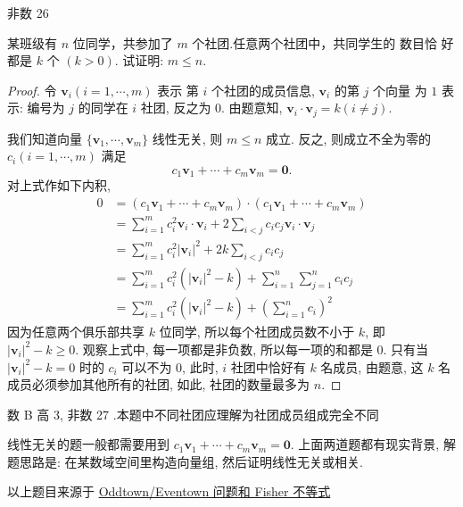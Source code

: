 \documentclass[a4paper, 12pt, UTF8]{ctexart}
\begin{document}
{\color{GoogleGreen} 非数 26}

\clearpage
\begin{exa}
    某班级有 $n$ 位同学，共参加了 $m$ 个社团.任意两个社团中，共同学生的
    数目恰 好都是 $k$ 个 $(k>0)$. 试证明: $m \leq n$.
\end{exa} {\color{GoogleRed} \begin{proof}
    令 $\bm{v}_{i}(i = 1, \cdots, m)$ 表示
      第 $i$ 个社团的成员信息, $\bm{v}_{i}$ 的第 $j$ 个向量
      为 $1$ 表示: 编号为 $j$ 的同学在 $i$ 社团, 反之为 $0$. 由题意知, $\bm{v}_{i}\cdot \bm{v}_{j} = k(i\neq j)$.

      我们知道向量 $\{\bm{v}_{1}, \cdots, \bm{v}_{m} \}$ 线性无关, 则 $m \leq n$ 成立. 反之, 则成立不全为零的 $c_{i}(i=1,\cdots,m)$ 满足
      \[
          c_{1}\bm{v}_{1} + \cdots + c_{m}\bm{v}_{m} = \bm{0}.
      \]
      对上式作如下内积,
      \[
          \begin{aligned}
            0 &= (c_{1}\bm{v}_{1} + \cdots + c_{m}\bm{v}_{m}) \cdot (c_{1}\bm{v}_{1} + \cdots + c_{m}\bm{v}_{m}) \\[3pt]
            &= \sum_{i=1}^{m}c_{i}^{2}\bm{v}_{i}\cdot\bm{v}_{i} + 2\sum_{i<j}c_{i}c_{j}\bm{v}_{i}\cdot\bm{v}_{j} \\[3pt]
            &= \sum_{i=1}^{m}c_{i}^{2}|\bm{v}_{i}|^{2} + 2k\sum_{i<j}c_{i}c_{j} \\[3pt]
            &= \sum_{i=1}^{m}c_{i}^{2}(|\bm{v}_{i}|^{2}-k) + \sum_{i=1}^{n}\sum_{j=1}^{n}c_{i}c_{j}\\[3pt]
            &= \sum_{i=1}^{m}c_{i}^{2}(|\bm{v}_{i}|^{2}-k) + \left( \sum_{i=1}^{n} c_{i}\right)^{2}
          \end{aligned}
      \]
      因为任意两个俱乐部共享 $k$ 位同学, 所以每个社团成员数不小于 $k$, 即 $|\bm{v}_{i}|^{2}-k \geq 0$. 观察上式中, 每一项都是非负数, 所以每一项的和都是 $0$. 只有当 $|\bm{v}_{i}|^{2}-k = 0$ 时的 $c_{i}$ 可以不为 $0$, 此时, $i$ 社团中恰好有 $k$ 名成员, 由题意, 这 $k$ 名成员必须参加其他所有的社团, 如此, 社团的数量最多为 $n$.
    
\end{proof}
}

{\color{GoogleGreen} 数 B 高 3, 非数 27 .本题中不同社团应理解为社团成员组成完全不同

}

\vspace{3em}

\begin{thm}{}{}
    {\adkaiti
      线性无关的题一般都需要用到 {\color{GoogleRed}$ c_{1}\bm{v}_{1} + \cdots + c_{m}\bm{v}_{m} = \bm{0}$}. 上面两道题都有现实背景, 解题思路是: 在某数域空间里构造向量组, 然后证明线性无关或相关.

      以上题目来源于 \href{https://math.mit.edu/~lmlovasz/oddtowngood.pdf}{Oddtown/Eventown 问题和 Fisher 不等式}
      }
\end{thm}
\end{document}
